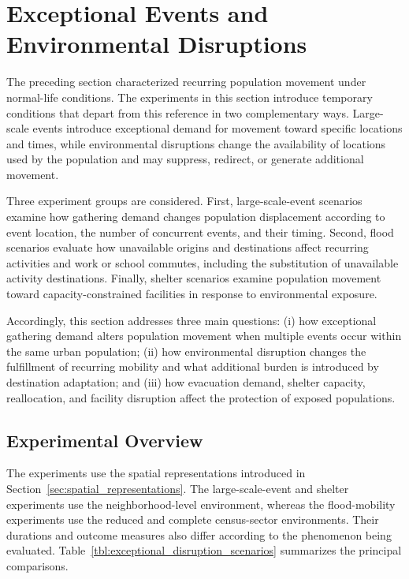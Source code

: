 

\section{Exceptional Events and Environmental Disruptions}
\label{sec:results_exceptional_events_disruptions}

The preceding section characterized recurring population movement under normal-life conditions. The experiments in this section introduce temporary conditions that depart from this reference in two complementary ways. Large-scale events introduce exceptional demand for movement toward specific locations and times, while environmental disruptions change the availability of locations used by the population and may suppress, redirect, or generate additional movement.

Three experiment groups are considered. First, large-scale-event scenarios examine how gathering demand changes population displacement according to event location, the number of concurrent events, and their timing. Second, flood scenarios evaluate how unavailable origins and destinations affect recurring activities and work or school commutes, including the substitution of unavailable activity destinations. Finally, shelter scenarios examine population movement toward capacity-constrained facilities in response to environmental exposure.

Accordingly, this section addresses three main questions: (i) how exceptional gathering demand alters population movement when multiple events occur within the same urban population; (ii) how environmental disruption changes the fulfillment of recurring mobility and what additional burden is introduced by destination adaptation; and (iii) how evacuation demand, shelter capacity, reallocation, and facility disruption affect the protection of exposed populations.


\subsection{Experimental Overview}
\label{sec:exceptional_disruption_overview}

The experiments use the spatial representations introduced in Section~\ref{sec:spatial_representations}. The large-scale-event and shelter experiments use the neighborhood-level environment, whereas the flood-mobility experiments use the reduced and complete census-sector environments. Their durations and outcome measures also differ according to the phenomenon being evaluated. Table~\ref{tbl:exceptional_disruption_scenarios} summarizes the principal comparisons.


